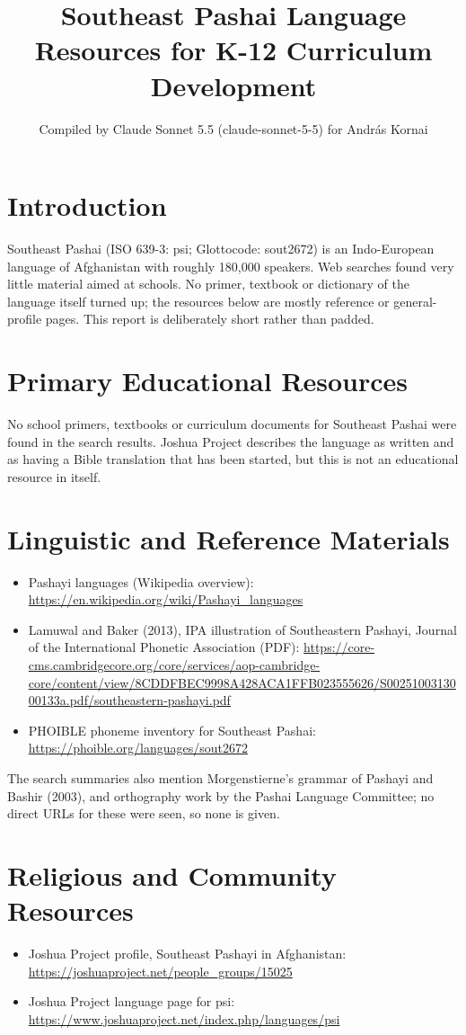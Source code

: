 \documentclass[12pt]{article}
\title{Southeast Pashai Language Resources for K-12 Curriculum Development}
\author{Compiled by Claude Sonnet 5.5 (claude-sonnet-5-5) for Andr\'as Kornai}
\date{}
\begin{document}
\maketitle

\section{Introduction}
Southeast Pashai (ISO 639-3: psi; Glottocode: sout2672) is an Indo-European language of Afghanistan with roughly 180,000 speakers. Web searches found very little material aimed at schools. No primer, textbook or dictionary of the language itself turned up; the resources below are mostly reference or general-profile pages. This report is deliberately short rather than padded.

\section{Primary Educational Resources}
No school primers, textbooks or curriculum documents for Southeast Pashai were found in the search results. Joshua Project describes the language as written and as having a Bible translation that has been started, but this is not an educational resource in itself.

\section{Linguistic and Reference Materials}
\begin{itemize}
\item Pashayi languages (Wikipedia overview): \url{https://en.wikipedia.org/wiki/Pashayi_languages}
\item Lamuwal and Baker (2013), IPA illustration of Southeastern Pashayi, Journal of the International Phonetic Association (PDF): \url{https://core-cms.cambridgecore.org/core/services/aop-cambridge-core/content/view/8CDDFBEC9998A428ACA1FFB023555626/S0025100313000133a.pdf/southeastern-pashayi.pdf}
\item PHOIBLE phoneme inventory for Southeast Pashai: \url{https://phoible.org/languages/sout2672}
\end{itemize}
The search summaries also mention Morgenstierne's grammar of Pashayi and Bashir (2003), and orthography work by the Pashai Language Committee; no direct URLs for these were seen, so none is given.

\section{Religious and Community Resources}
\begin{itemize}
\item Joshua Project profile, Southeast Pashayi in Afghanistan: \url{https://joshuaproject.net/people_groups/15025}
\item Joshua Project language page for psi: \url{https://www.joshuaproject.net/index.php/languages/psi}
\end{itemize}
\end{document}
